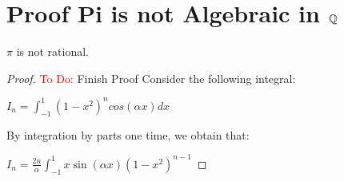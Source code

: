 \section{Proof Pi is not Algebraic in $\mathbb Q$}

\begin{theorem}
    $\pi$ is not rational.
\end{theorem}

\begin{proof}

    \textcolor{red}{To Do:} Finish Proof
    Consider the following integral:

    $I_n = \int_{-1}^{1} (1-x^2)^ncos(\alpha x)dx$

    By integration by parts one time, we obtain that:

    $I_n = \frac{2n}{\alpha}\int_{-1}^{1}x\sin(\alpha x)(1-x^2)^{n-1}$
\end{proof}